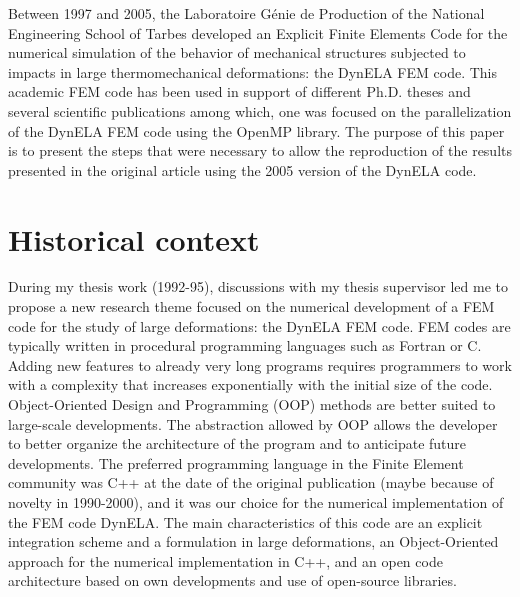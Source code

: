 


Between 1997 and 2005, the Laboratoire G\'enie de Production of the National Engineering School of Tarbes developed an Explicit Finite Elements Code for the numerical simulation of the behavior of mechanical structures subjected to impacts in large thermomechanical deformations: the DynELA FEM code. This academic FEM code has been used in support of different Ph.D. theses and several scientific publications \cite{Pantale:2002,Pantale:2004,Menanteau:2006,Nistor:2007,Nistor:2008} among which, one \cite{Pantale:2005} was focused on the parallelization of the DynELA FEM code using the OpenMP library. The purpose of this paper is to present the steps that were necessary to allow the reproduction of the results presented in the original article \cite{Pantale:2005} using the 2005 version of the DynELA code.

\section{Historical context}

During my thesis work (1992-95), discussions with my thesis supervisor led me to propose a new research theme focused on the numerical development of a FEM code for the study of large deformations: the DynELA FEM code. FEM codes are typically written in procedural programming languages such as Fortran or C. Adding new features to already very long programs requires programmers to work with a complexity that increases exponentially with the initial size of the code. Object-Oriented Design and Programming (OOP) methods are better suited to large-scale developments. The abstraction allowed by OOP allows the developer to better organize the architecture of the program and to anticipate future developments. The preferred programming language in the Finite Element community was C++ at the date of the original publication (maybe because of novelty in 1990-2000), and it was our choice for the numerical implementation of the FEM code DynELA. The main characteristics of this code are an explicit integration scheme and a formulation in large deformations, an Object-Oriented approach for the numerical implementation in C++, and an open code architecture based on own developments and use of open-source libraries.

